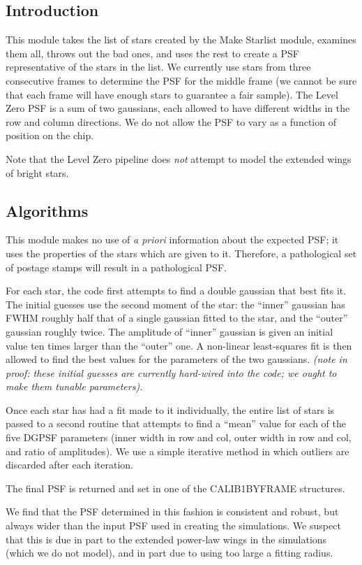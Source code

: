 
\def \fpsf{{\bf Find PSF\ }}
\def \fbs{{\bf Find Bright Stars\ }}

\subsection{Introduction}

  This module takes the list of stars created by the Make Starlist
module, examines them all, throws out the bad ones, and uses
the rest to create a PSF representative of the stars in the list.
We currently use stars from three consecutive frames to determine
the PSF for the middle frame (we cannot be sure that each frame
will have enough stars to guarantee a fair sample).
The Level Zero PSF is a sum of two gaussians, each allowed to have
different widths in the row and column directions.
We do not allow the PSF to vary as a function of position on the chip.

  Note that the Level Zero pipeline does {\it not} attempt to 
model the extended wings of bright stars.

\subsection{Algorithms}

  This module makes no use of {\it a priori} information about the
expected PSF; it uses the properties of the stars which are given 
to it.  Therefore, a pathological set of postage stamps will 
result in a pathological PSF.

  For each star, the code first attempts to find a double
gaussian that best fits it.  The initial guesses use the
second moment of the star: the ``inner'' gaussian has FWHM 
roughly half that of a single gaussian fitted to the star, 
and the ``outer'' gaussian roughly twice.  The amplitude of
``inner'' gaussian is given an initial value ten times larger
than the ``outer'' one.  A non-linear least-squares fit is
then allowed to find the best values for the parameters of the
two gaussians.  
{\it (note in proof: these initial guesses are currently
hard-wired into the code; we ought to make them tunable parameters). }

  Once each star has had a fit made to it individually, the
entire list of stars is passed to a second routine that attempts
to find a ``mean'' value for each of the five DGPSF parameters
(inner width in row and col, outer width in row and col, and ratio
of amplitudes).  We use a simple iterative method in which 
outliers are discarded after each iteration.

   The final PSF is returned and set in one of the CALIB1BYFRAME
structures.

   We find that the PSF determined in this fashion is 
consistent and robust, but always wider than the input PSF 
used in creating the simulations.  We suspect that this is due
in part to the extended power-law wings in the simulations
(which we do not model), and in part due to using too large 
a fitting radius.

